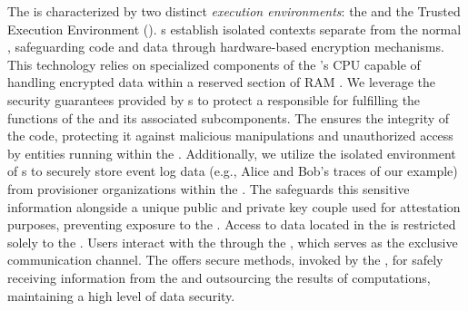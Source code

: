 The  is characterized by two distinct \textit{execution environments}: the  and the Trusted Execution Environment (). s establish isolated contexts separate from the normal , safeguarding code and data through hardware-based encryption mechanisms. This technology relies on specialized components of the 's CPU capable of handling encrypted data within a reserved section of RAM \cite{TEEHERE}. We leverage the security guarantees provided by s to protect a  responsible for fulfilling the functions of the  and its associated subcomponents. %
The  ensures the integrity of the  code, protecting it against malicious manipulations and unauthorized access by entities running within the . Additionally, we utilize the isolated environment of s to securely store event log data (e.g., Alice and Bob's traces of our example) from provisioner organizations within the . The  safeguards this sensitive information alongside a unique public and private key couple used for attestation purposes, preventing exposure to the . Access to data located in the  is restricted solely to the . Users interact with the  through the , which serves as the exclusive communication channel. The  offers secure methods, invoked by the , for safely receiving information from the  and outsourcing the results of computations, maintaining a high level of data security.


